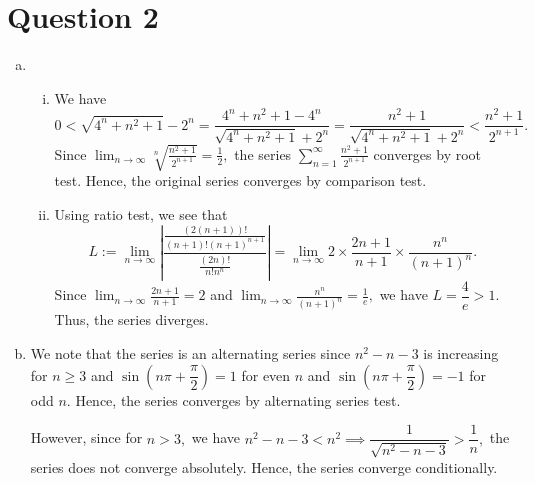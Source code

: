 \documentclass{article}
\begin{document}
\section*{Question 2}
\begin{enumerate}[(a)]
    \item \begin{enumerate}[(i)]
        \item We have $$0<\sqrt{4^n+n^2+1}-2^n=\frac{4^n+n^2+1-4^n}{\sqrt{4^n+n^2+1}+2^n}=\frac{n^2+1}{\sqrt{4^n+n^2+1}+2^n}<\frac{n^2+1}{2^{n+1}}.$$
        Since $\displaystyle\lim_{n\to\infty}\sqrt[n]{\frac{n^2+1}{2^{n+1}}}=\frac{1}{2},$ the series $\displaystyle\sum^{\infty}_{n=1}\frac{n^2+1}{2^{n+1}}$ converges by root test. Hence, the original series converges by comparison test.
        \item Using ratio test, we see that $$L:=\lim_{n\to\infty}\left|\frac{\frac{(2(n+1))!}{(n+1)!(n+1)^{n+1}}}{\frac{(2n)!}{n!n^n}}\right|=\lim_{n\to\infty}2\times\frac{2n+1}{n+1}\times\frac{n^n}{(n+1)^n}.$$
        Since $\displaystyle\lim_{n\to\infty}\frac{2n+1}{n+1}=2$ and $\displaystyle\lim_{n\to\infty}\frac{n^n}{(n+1)^n}=\frac{1}{e},$ we have $L=\dfrac{4}{e}>1.$ Thus, the series diverges.
    \end{enumerate}
    \item We note that the series is an alternating series since $n^2-n-3$ is increasing for $n\geq3$ and $\sin\left(n\pi+\dfrac{\pi}{2}\right)=1$ for even $n$ and $\sin\left(n\pi+\dfrac{\pi}{2}\right)=-1$ for odd $n.$ Hence, the series converges by alternating series test.
    
    However, since for $n>3,$ we have $n^2-n-3<n^2\implies \dfrac{1}{\sqrt{n^2-n-3}}>\dfrac{1}{n},$ the series does not converge absolutely. Hence, the series converge conditionally.
\end{enumerate}
\end{document}
